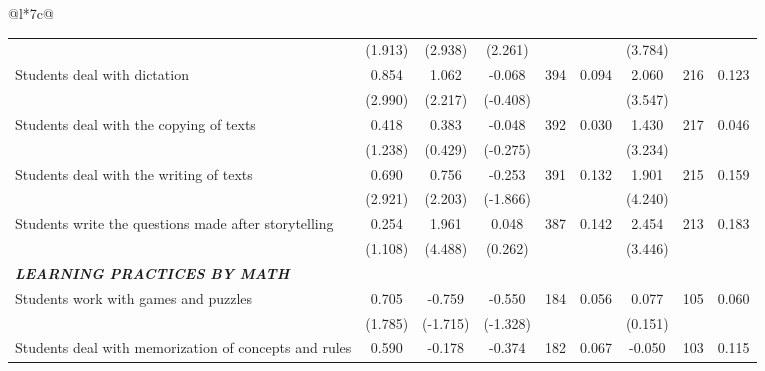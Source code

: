 \documentclass[a4paper, 12pt]{article}
\newcommand{\sym}[1]{\rlap{#1}}%
\begin{document}
\begin{longtable}{@{\extracolsep{1pt}}l*{7}{c}@{}}
\begin{adjustbox}{max width=\textwidth}
\begin{tabular}{l*{8}{c}}
            &     (1.913)         &     (2.938)         &     (2.261)         &              &        &     (3.784)                \\
Students deal with dictation     &       0.854\sym{**} &       1.062\sym{*}  &     -0.068         &       394 &   0.094 &       2.060\sym{***}         &       216        &    0.123     \\
            &     (2.990)         &     (2.217)         &     (-0.408)         &             &     &     (3.547)                  \\
Students deal with the copying of texts     &       0.418         &       0.383         &     -0.048         &      392 &     0.030      &       1.430\sym{**}         &       217        &        0.046   \\
            &     (1.238)         &     (0.429)         &     (-0.275)         &              &        &     (3.234)                \\
Students deal with the writing of texts     &       0.690\sym{**} &       0.756\sym{*}  &      -0.253         &       391         &       0.132        &       1.901\sym{***}         &       215        &    0.159     \\
            &     (2.921)         &     (2.203)         &     (-1.866)         &              &        &     (4.240)                \\
Students write the questions made after storytelling     &       0.254         &       1.961\sym{***}&      0.048         &     387         &       0.142     &       2.454\sym{***} &       213        &        0.183    \\
            &     (1.108)         &     (4.488)         &     (0.262)         &              &        &     (3.446)                \\
\midrule
\textbf{\emph{LEARNING PRACTICES BY MATH}}&            &            &            &                     &               \\           
Students work with games and puzzles     &       0.705         &      -0.759         &      -0.550         &   184    &     0.056     &       0.077         &       105       &        0.060    \\
            &     (1.785)         &     (-1.715)         &     (-1.328)         &              &       &     (0.151)                 \\
Students deal with memorization of concepts and rules     &       0.590         &      -0.178         &      -0.374         &       182  &     0.067     &       -0.050         &       103        &        0.115    \\

\end{tabular}
\end{adjustbox}
\end{longtable}
\end{document}
